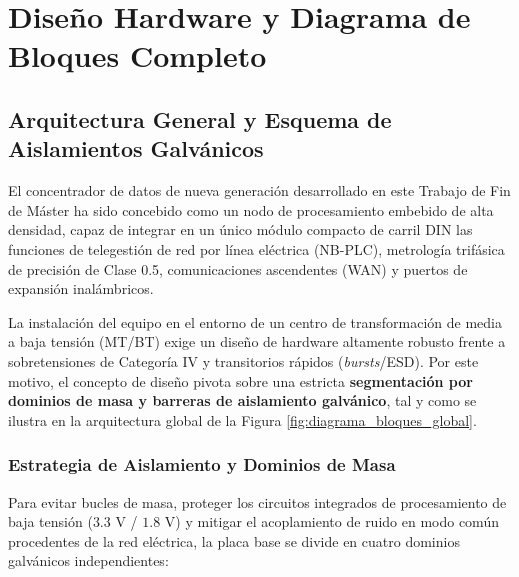 \chapter{Diseño Hardware y Diagrama de Bloques Completo}
\label{ch:hardware_design}

\section{Arquitectura General y Esquema de Aislamientos Galvánicos}
\label{sec:arquitectura_general}

El concentrador de datos de nueva generación desarrollado en este Trabajo de Fin de Máster ha sido concebido como un nodo de procesamiento embebido de alta densidad, capaz de integrar en un único módulo compacto de carril DIN las funciones de telegestión de red por línea eléctrica (NB-PLC), metrología trifásica de precisión de Clase 0.5, comunicaciones ascendentes (WAN) y puertos de expansión inalámbricos.

La instalación del equipo en el entorno de un centro de transformación de media a baja tensión (MT/BT) exige un diseño de hardware altamente robusto frente a sobretensiones de Categoría IV y transitorios rápidos (\textit{bursts}/ESD). Por este motivo, el concepto de diseño pivota sobre una estricta \textbf{segmentación por dominios de masa y barreras de aislamiento galvánico}, tal y como se ilustra en la arquitectura global de la Figura \ref{fig:diagrama_bloques_global}.

\subsection{Estrategia de Aislamiento y Dominios de Masa}
\label{subsec:estrategia_aislamiento}

Para evitar bucles de masa, proteger los circuitos integrados de procesamiento de baja tensión ($3.3\text{ V}$ / $1.8\text{ V}$) y mitigar el acoplamiento de ruido en modo común procedentes de la red eléctrica, la placa base se divide en cuatro dominios galvánicos independientes:

